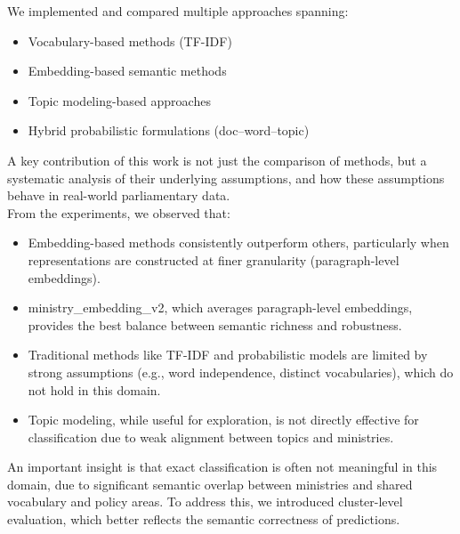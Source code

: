 \documentclass{report}
\begin{document}
We implemented and compared multiple approaches spanning:
\begin{itemize}
    \item Vocabulary-based methods (TF-IDF)
    \item Embedding-based semantic methods
    \item Topic modeling-based approaches
    \item Hybrid probabilistic formulations (doc–word–topic)
\end{itemize}

A key contribution of this work is not just the comparison of methods, but a systematic analysis of their underlying assumptions, and how these assumptions behave in real-world parliamentary data. \\

From the experiments, we observed that:
\begin{itemize}
    \item Embedding-based methods consistently outperform others, particularly when representations are constructed at finer granularity (paragraph-level embeddings).
    \item ministry\_embedding\_v2, which averages paragraph-level embeddings, provides the best balance between semantic richness and robustness.
    \item Traditional methods like TF-IDF and probabilistic models are limited by strong assumptions (e.g., word independence, distinct vocabularies), which do not hold in this domain.
    \item Topic modeling, while useful for exploration, is not directly effective for classification due to weak alignment between topics and ministries.
\end{itemize}

An important insight is that exact classification is often not meaningful in this domain, due to significant semantic overlap between ministries and shared vocabulary and policy areas. To address this, we introduced cluster-level evaluation, which better reflects the semantic correctness of predictions.
\end{document}
